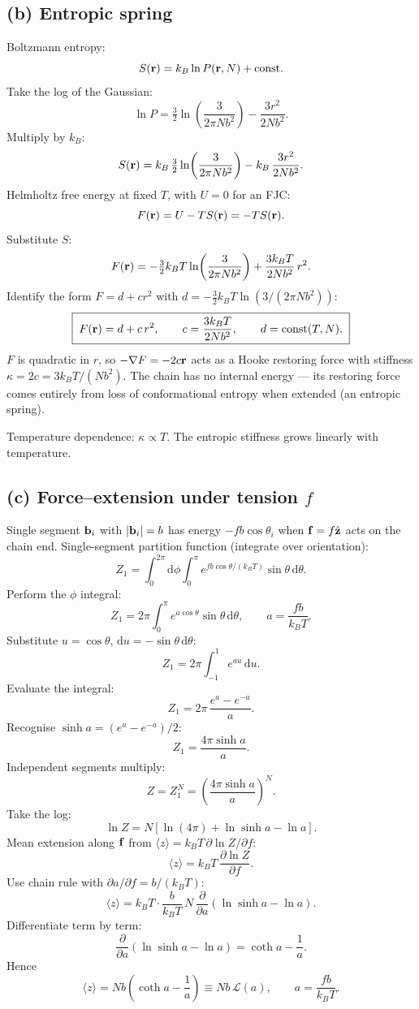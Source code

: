 \documentclass[11pt]{article}
\newcommand{\de}{\mathrm{d}}
\newcommand{\pd}[2]{\frac{\partial #1}{\partial #2}}
\begin{document}
\subsection*{(b) Entropic spring}

Boltzmann entropy:
\[ S(\vb r) = k_B \ln P(\vb r,N) + \text{const}. \]
Take the log of the Gaussian:
\[ \ln P = \tfrac32\ln\!\left(\frac{3}{2\pi N b^2}\right) - \frac{3 r^2}{2 N b^2}. \]
Multiply by $k_B$:
\[ S(\vb r) = k_B\,\tfrac32\ln\!\left(\frac{3}{2\pi N b^2}\right) - k_B\,\frac{3 r^2}{2 N b^2}. \]
Helmholtz free energy at fixed $T$, with $U=0$ for an FJC:
\[ F(\vb r) = U - T S(\vb r) = -T S(\vb r). \]
Substitute $S$:
\[ F(\vb r) = -\tfrac32 k_B T\ln\!\left(\frac{3}{2\pi N b^2}\right) + \frac{3 k_B T}{2 N b^2}\,r^2. \]
Identify the form $F = d + cr^2$ with $d=-\tfrac32 k_BT\ln(3/(2\pi Nb^2))$:
\[ \boxed{\;F(\vb r) = d + c\,r^2,\qquad c = \frac{3 k_B T}{2 N b^2},\qquad d=\text{const}(T,N).\;} \]
$F$ is quadratic in $r$, so $-\nabla F = -2c\vb r$ acts as a Hooke restoring force with stiffness $\kappa = 2c = 3 k_B T/(N b^2)$. The chain has no internal energy --- its restoring force comes entirely from loss of conformational entropy when extended (an entropic spring).

Temperature dependence: $\kappa\propto T$. The entropic stiffness grows linearly with temperature.

\subsection*{(c) Force--extension under tension $f$}

Single segment $\vb b_i$ with $|\vb b_i|=b$ has energy $-fb\cos\theta_i$ when $\vb f = f\hat{\vb z}$ acts on the chain end. Single-segment partition function (integrate over orientation):
\[ Z_1 = \int_0^{2\pi}\!\de\phi\!\int_0^{\pi}\!e^{f b\cos\theta/(k_BT)}\sin\theta\,\de\theta. \]
Perform the $\phi$ integral:
\[ Z_1 = 2\pi\!\int_0^{\pi}\!e^{a\cos\theta}\sin\theta\,\de\theta,\qquad a=\frac{fb}{k_BT}. \]
Substitute $u=\cos\theta$, $\de u=-\sin\theta\,\de\theta$:
\[ Z_1 = 2\pi\!\int_{-1}^{1} e^{a u}\,\de u. \]
Evaluate the integral:
\[ Z_1 = 2\pi\,\frac{e^a - e^{-a}}{a}. \]
Recognise $\sinh a = (e^a-e^{-a})/2$:
\[ Z_1 = \frac{4\pi\sinh a}{a}. \]
Independent segments multiply:
\[ Z = Z_1^{N} = \!\left(\frac{4\pi\sinh a}{a}\right)^{\!N}. \]
Take the log:
\[ \ln Z = N\!\left[\ln(4\pi) + \ln\sinh a - \ln a\right]. \]
Mean extension along $\vb f$ from $\langle z\rangle = k_B T\,\partial\ln Z/\partial f$:
\[ \langle z\rangle = k_BT\,\pd{\ln Z}{f}. \]
Use chain rule with $\partial a/\partial f = b/(k_BT)$:
\[ \langle z\rangle = k_B T\cdot\frac{b}{k_BT}\,N\,\pd{}{a}(\ln\sinh a - \ln a). \]
Differentiate term by term:
\[ \pd{}{a}(\ln\sinh a - \ln a) = \coth a - \frac{1}{a}. \]
Hence
\[ \boxed{\;\langle z\rangle = N b\!\left(\coth a - \frac{1}{a}\right)\equiv N b\,\mathcal L(a),\qquad a=\frac{fb}{k_B T}.\;} \]
\end{document}
